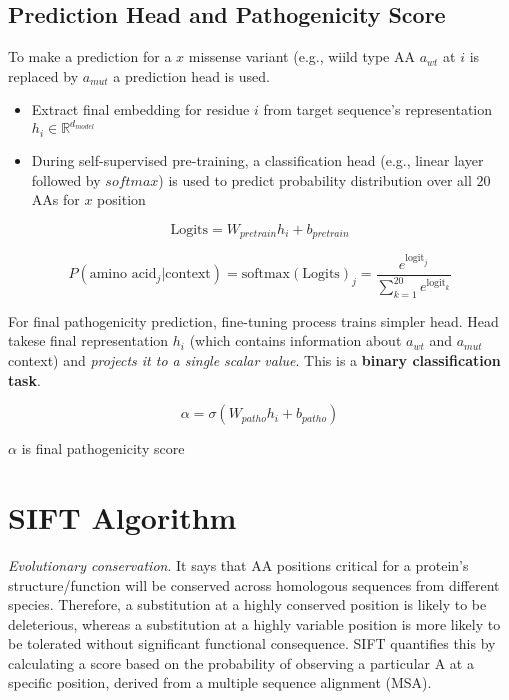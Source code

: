 \documentclass[../main.tex]{subfiles}
\begin{document}
\subsection*{Prediction Head and Pathogenicity Score}
To make a prediction for a $x$ missense variant  (e.g., wiild type AA $a_{wt}$ at $i$ is replaced by $a_{mut}$ a prediction head is used.
\begin{itemize}
    \item Extract final embedding for residue $i$ from target sequence's representation $h_i \in \mathbb{R}^{d_{model}}$
    \item During self-supervised pre-training, a classification head  (e.g., linear layer followed by $softmax$) is used to predict probability distribution over all $20$ AAs for $x$ position
\end{itemize}

\begin{equation}
    \text{Logits} = W_{pretrain}h_i + b_{pretrain}
\end{equation}


\begin{equation}
    P(\text{amino acid}_j|\text{context}) = \text{softmax}(\text{Logits})_j = \frac{e^{\text{logit}_j}}{\sum_{k=1}^{20} e^{\text{logit}_k}}
\end{equation}

For final pathogenicity prediction, fine-tuning process trains simpler head. Head takese final representation $h_i$ (which contains information about $a_{wt}$ and $a_{mut}$ context) and \textit{projects it to a single scalar value}. This is a \textbf{binary classification task}.

\begin{equation}
    \alpha = \sigma(W_{patho}h_i + b_{patho})
\end{equation}

$\alpha$ is final pathogenicity score

\hrulefill

 \cite{Ng2003SIFT}

\hrulefill

\section{SIFT Algorithm}

\textit{Evolutionary conservation}. It says that AA positions critical for a protein's structure/function will be conserved across homologous sequences from different species. Therefore, a substitution at a highly conserved position is likely to be deleterious, whereas a substitution at a highly variable position is more likely to be tolerated without significant functional consequence. SIFT quantifies this by calculating a score based on the probability of observing a particular A at a specific position, derived from a multiple sequence alignment (MSA).
\end{document}

